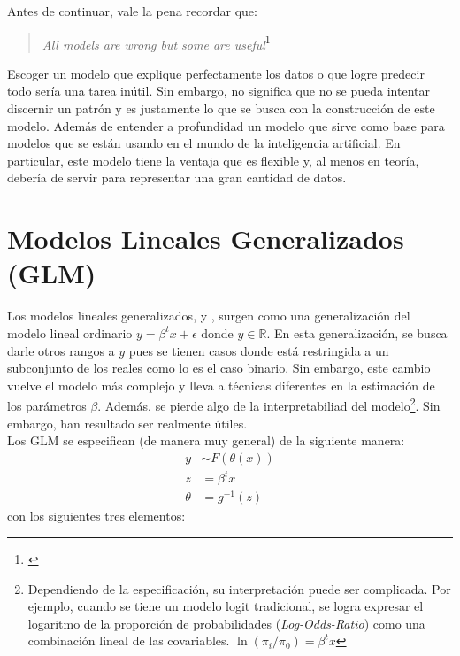 \documentclass[../Main/Main.tex]{subfiles}
\begin{document}
Antes de continuar, vale la pena recordar que:
\begin{quote}
\textit{All models are wrong but some are useful}\footnote{\autocite{box1979robustnessinthe}}
\end{quote}

Escoger un modelo que explique perfectamente los datos o que logre predecir todo sería una tarea inútil. Sin embargo, no significa que no se pueda intentar discernir un patrón y es justamente lo que se busca con la construcción de este modelo. Además de entender a profundidad un modelo que sirve como base para modelos que se están usando en el mundo de la inteligencia artificial. En particular, este modelo tiene la ventaja que es flexible y, al menos en teoría, debería de servir para representar una gran cantidad de datos.

\section{Modelos Lineales Generalizados (GLM)} \label{sec:GLM}
Los modelos lineales generalizados, \autocite{sundberg2016exponential} y \autocite{maccullagh1989generalized}, surgen como una generalización del modelo lineal ordinario $y = \beta^tx + \epsilon$ donde $y \in\mathbb{R}$. En esta generalización, se busca darle otros rangos a $y$ pues se tienen casos donde está restringida a un subconjunto de los reales como lo es el caso binario. Sin embargo, este cambio vuelve el modelo más complejo y lleva a técnicas diferentes en la estimación de los parámetros $\beta$. Además, se pierde algo de la interpretabiliad del modelo\footnote{Dependiendo de la especificación, su interpretación puede ser complicada. Por ejemplo, cuando se tiene un modelo logit tradicional, se logra expresar el logaritmo de la proporción de probabilidades (\textit{Log-Odds-Ratio}) como una combinación lineal de las covariables. $\ln(\pi_i / \pi_0) = \beta^t x$}. Sin embargo, han resultado ser realmente útiles. \\

Los GLM se especifican (de manera muy general) de la siguiente manera:
\begin{align} 
	y &\sim F(\theta(x)) \label{ec:GLM} \\ 
	z &= \beta^tx \nonumber \\ 
	\theta &= g^{-1}(z) \nonumber
\end{align}
con los siguientes tres elementos:
\end{document}
